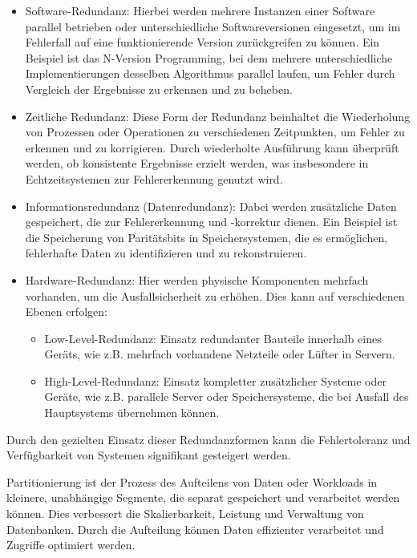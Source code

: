 \begin{itemize}
    \item Software-Redundanz: Hierbei werden mehrere Instanzen einer Software parallel betrieben oder unterschiedliche Softwareversionen eingesetzt, um im Fehlerfall auf eine funktionierende Version zurückgreifen zu können. Ein Beispiel ist das N-Version Programming, bei dem mehrere unterschiedliche Implementierungen desselben Algorithmus parallel laufen, um Fehler durch Vergleich der Ergebnisse zu erkennen und zu beheben.
    \item Zeitliche Redundanz: Diese Form der Redundanz beinhaltet die Wiederholung von Prozessen oder Operationen zu verschiedenen Zeitpunkten, um Fehler zu erkennen und zu korrigieren. Durch wiederholte Ausführung kann überprüft werden, ob konsistente Ergebnisse erzielt werden, was insbesondere in Echtzeitsystemen zur Fehlererkennung genutzt wird.
    \item Informationsredundanz (Datenredundanz): Dabei werden zusätzliche Daten gespeichert, die zur Fehlererkennung und -korrektur dienen. Ein Beispiel ist die Speicherung von Paritätsbits in Speichersystemen, die es ermöglichen, fehlerhafte Daten zu identifizieren und zu rekonstruieren.
    \item Hardware-Redundanz: Hier werden physische Komponenten mehrfach vorhanden, um die Ausfallsicherheit zu erhöhen. Dies kann auf verschiedenen Ebenen erfolgen:
    \begin{itemize}
        \item Low-Level-Redundanz: Einsatz redundanter Bauteile innerhalb eines Geräts, wie z.B. mehrfach vorhandene Netzteile oder Lüfter in Servern.
        \item High-Level-Redundanz: Einsatz kompletter zusätzlicher Systeme oder Geräte, wie z.B. parallele Server oder Speichersysteme, die bei Ausfall des Hauptsystems übernehmen können.
    \end{itemize}
\end{itemize}

Durch den gezielten Einsatz dieser Redundanzformen kann die Fehlertoleranz und Verfügbarkeit von Systemen
signifikant gesteigert werden.


Partitionierung ist der Prozess des Aufteilens von Daten oder Workloads in kleinere, unabhängige Segmente,
die separat gespeichert und verarbeitet werden können.
Dies verbessert die Skalierbarkeit, Leistung und Verwaltung von Datenbanken.
Durch die Aufteilung können Daten effizienter verarbeitet und Zugriffe optimiert werden.

